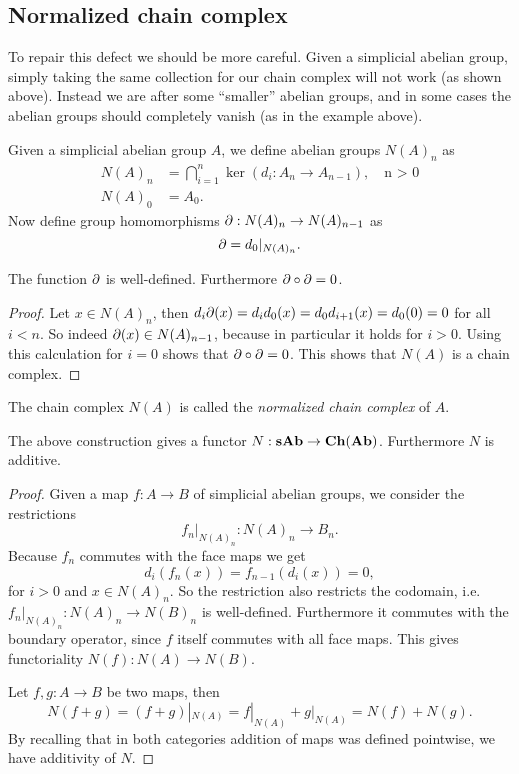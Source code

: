 \subsection{Normalized chain complex}
To repair this defect we should be more careful. Given a simplicial abelian group, simply taking the same collection for our chain complex will not work (as shown above). Instead we are after some ``smaller'' abelian groups, and in some cases the abelian groups should completely vanish (as in the example above).

Given a simplicial abelian group $A$, we define abelian groups $N(A)_n$ as
\begin{align*}
	N(A)_n &= \bigcap_{i=1}^{n} \ker(d_i: A_n \to A_{n-1}), \quad\text{n > 0} \\
	N(A)_0 &= A_0.
\end{align*}
Now define group homomorphisms $\partial: N(A)_n \to N(A)_{n-1}$ as
$$ \partial = d_0|_{N(A)_n}. $$
\begin{lemma}
	The function $ \partial $ is well-defined. Furthermore $ \partial \circ \partial = 0 $.
\end{lemma}
\begin{proof}
	Let $x \in N(A)_n$, then $d_i \partial(x) = d_i d_0(x) = d_0 d_{i+1}(x) = d_0 (0) = 0$ for all $i < n$. So indeed $\partial(x) \in N(A)_{n-1}$, because in particular it holds for $i > 0$. Using this calculation for $i = 0$ shows that $\partial \circ \partial = 0$. This shows that $N(A)$ is a chain complex.
\end{proof}

The chain complex $N(A)$ is called the \emph{normalized chain complex} of $A$.
\begin{lemma}
	The above construction gives a functor $N: \mathbf{sAb} \to \mathbf{Ch}(\mathbf{Ab})$. Furthermore $N$ is additive.
\end{lemma}
\begin{proof}
	Given a map $f: A \to B$ of simplicial abelian groups, we consider the restrictions
	$$ f_n |_{N(A)_n}: N(A)_n \to B_n. $$
	Because $f_n$ commutes with the face maps we get
	$$ d_i(f_n(x)) = f_{n-1}(d_i(x)) = 0, $$
	for $i>0$ and $x \in N(A)_n$. So the restriction also restricts the codomain, i.e. $f_n |_{N(A)_n}: N(A)_n \to N(B)_n$ is well-defined. Furthermore it commutes with the boundary operator, since $f$ itself commutes with all face maps. This gives functoriality $N(f): N(A) \to N(B)$.

	Let $f, g: A \to B$ be two maps, then
	$$ N(f+g) = (f+g)|_{N(A)} = f|_{N(A)} + g|_{N(A)} = N(f) + N(g). $$
	By recalling that in both categories addition of maps was defined pointwise, we have additivity of $N$.
\end{proof}

